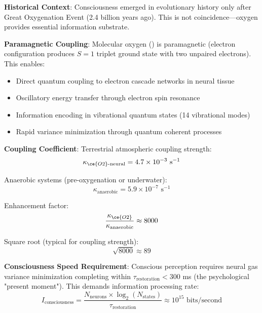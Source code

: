 \documentclass[11pt,onecolumn]{article}
\begin{document}
\textbf{Historical Context}: Consciousness emerged in evolutionary history only after Great Oxygenation Event (2.4 billion years ago). This is not coincidence---oxygen provides essential information substrate.

\textbf{Paramagnetic Coupling}: Molecular oxygen () is paramagnetic (electron configuration produces $S=1$ triplet ground state with two unpaired electrons). This enables:
\begin{itemize}
\item Direct quantum coupling to electron cascade networks in neural tissue
\item Oscillatory energy transfer through electron spin resonance
\item Information encoding in vibrational quantum states (14 vibrational modes)
\item Rapid variance minimization through quantum coherent processes
\end{itemize}

\textbf{Coupling Coefficient}: Terrestrial atmospheric  coupling strength:
\begin{equation}
\kappa_{\ce{O2}\text{-neural}} = 4.7 \times 10^{-3} \text{ s}^{-1}
\end{equation}

Anaerobic systems (pre-oxygenation or underwater):
\begin{equation}
\kappa_{\text{anaerobic}} = 5.9 \times 10^{-7} \text{ s}^{-1}
\end{equation}

Enhancement factor:
\begin{equation}
\frac{\kappa_{\ce{O2}}}{\kappa_{\text{anaerobic}}} \approx 8000
\end{equation}

Square root (typical for coupling strength):
\begin{equation}
\sqrt{8000} \approx 89
\end{equation}

\textbf{Consciousness Speed Requirement}: Conscious perception requires neural gas variance minimization completing within $\tau_{\text{restoration}} < 300$ ms (the psychological "present moment"). This demands information processing rate:
\begin{equation}
I_{\text{consciousness}} = \frac{N_{\text{neurons}} \times \log_2(N_{\text{states}})}{\tau_{\text{restoration}}} \approx 10^{15} \text{ bits/second}
\end{equation}
\end{document}
